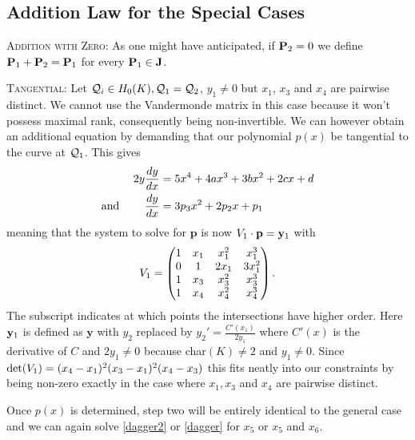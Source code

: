 \documentclass[english,11pt,a4paper]{article}
\begin{document}
\subsection{Addition Law for the Special Cases}

\setcounter{case}{-1}

\begin{case}
  {\scshape Addition with Zero:} As one might have anticipated, if $\P_2 = 0$ we define $\P_1 + \P_2 = \P_1$ for every $\P_1 \in \J$.
\end{case}

\setcounter{case}{1}
\begin{case}
	{\scshape Tangential:} Let $\q_i\in \enk, \q_1 = \q_2$, $y_1 \neq 0$ but $x_1$, $x_3$ and $x_4$ are pairwise distinct. We cannot use the Vandermonde matrix in this case because it won't possess maximal rank, consequently being non-invertible. We can however obtain an additional equation by demanding that our polynomial $p(x)$ be tangential to the curve at $\q_1$. This gives
	\begin{align*}
	  2 y \frac{dy}{dx} &= 5  x^4 + 4 a x^3 + 3 b x^2 + 2 c x + d \\
	  \text{and\hspace{8mm}} \frac{dy}{dx} &= 3 p_3 x^2 + 2 p_2 x + p_1
	\end{align*}
	meaning that the system to solve for $\mathbf{p}$ is now $\Vdoub \cdot \mathbf{p} = \ydoub$ with
	\begin{align*}\Vdoub=
		\begin{pmatrix}
			1 & x_1 & x_1^2 & x_1^3\\
			0 & 1 & 2 x_1 & 3 x_1^2\\
			1 & x_3 & x_3^2 & x_3^3\\
			1 & x_4 & x_4^2 & x_4^3\\
		\end{pmatrix}.
	\end{align*}
	The subscript indicates at which points the intersections have higher order.
	Here $\ydoub$ is defined as $\mathbf{y}$ with $y_2$ replaced by $y_2'=\frac{C'(x_1)}{2 y_1}$ where $C'(x)$ is the derivative of $C$ and $2y_1 \neq 0$ because char$(K) \neq 2$ and $y_1\neq 0$. Since $\det(\Vdoub) = (x_4-x_1)^2(x_3-x_1)^2(x_4-x_3)$ this fits neatly into our constraints by being non-zero exactly in the case where $x_1, x_3$ and $x_4$ are pairwise distinct.

	Once $p(x)$ is determined, step two will be entirely identical to the general case and we can again solve \eqref{dagger2} or \eqref{dagger} for $x_5$ or $x_5$ and $x_6$.

\end{case}
\end{document}
